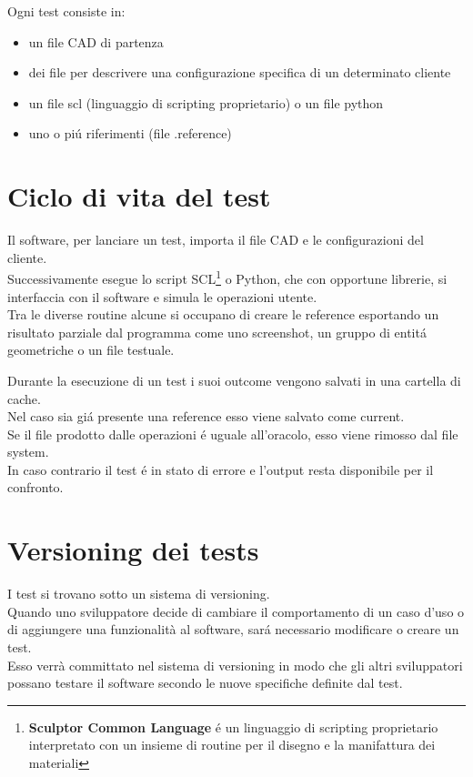         Ogni test consiste in:
        \begin{itemize}
            \item un file CAD di partenza
            \item dei file per descrivere una configurazione specifica di un determinato cliente
            \item un file scl (linguaggio di scripting proprietario) o un file python
            \item uno o pi\'u riferimenti (file .reference)
        \end{itemize}

    \section{Ciclo di vita del test}
        Il software, per lanciare un test, importa il file CAD e le configurazioni del cliente.\\
        Successivamente esegue lo script SCL\footnote{\textbf{Sculptor Common Language} \'e un linguaggio di scripting proprietario interpretato con un insieme di routine per il disegno e la manifattura dei materiali} o Python, che con opportune librerie, si interfaccia con il software
        e simula le operazioni utente. \\
        
        Tra le diverse routine alcune si occupano di creare le reference esportando un risultato parziale dal programma come uno screenshot, un gruppo di entit\'a geometriche o un file testuale.

        Durante la esecuzione di un test i suoi outcome vengono salvati in una cartella di cache.\\
        Nel caso sia gi\'a presente una reference esso viene salvato come current.\\

        Se il file prodotto dalle operazioni \'e uguale all'oracolo, esso viene rimosso dal file system.\\
        In caso contrario il test \'e in stato di errore e l'output resta disponibile per il confronto.\\

    \section{Versioning dei tests}
            I test si trovano sotto un sistema di versioning.\\
            Quando uno sviluppatore decide di cambiare il comportamento di un caso d'uso o di aggiungere una funzionalità al software,
            sar\'a necessario modificare o creare un test.\\
            Esso verrà committato nel sistema di versioning in modo che gli altri sviluppatori possano testare il software secondo le nuove specifiche definite dal test.    
